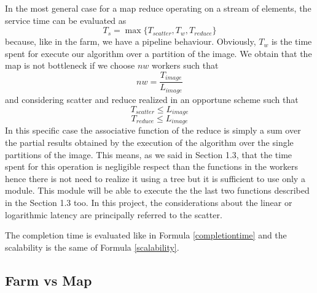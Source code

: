 In the most general case for a map reduce operating on a stream of elements, the service time can be evaluated as
\[
T_{s} = \max\lbrace T_{scatter}, T_{w}, T_{reduce}\rbrace
\]
because, like in the farm, we have a pipeline behaviour. Obviously, $T_{w}$ is the time spent for execute our algorithm over a partition of the image. We obtain that the map is not bottleneck if we choose $nw$ workers such that
\[
nw = \frac{T_{image}}{L_{image}}
\]
and considering scatter and reduce realized in an opportune scheme such that
\[
T_{scatter} \leq L_{image}
\]
\[
T_{reduce} \leq L_{image}
\] 
In this specific case the associative function of the reduce is simply a sum over the partial results obtained by the execution of the algorithm over the single partitions of the image. This means, as we said in Section 1.3, that the time spent for this operation is negligible respect than the functions in the workers hence there is not need to realize it using a tree but it is sufficient to use only a module. This module will be able to execute the the last two functions described in the Section 1.3 too. In this project, the considerations about the linear or logarithmic latency are principally referred to the scatter.

The completion time is evaluated like in Formula \ref{completiontime} and the scalability is the same of Formula \ref{scalability}.

\subsection{Farm vs Map}
